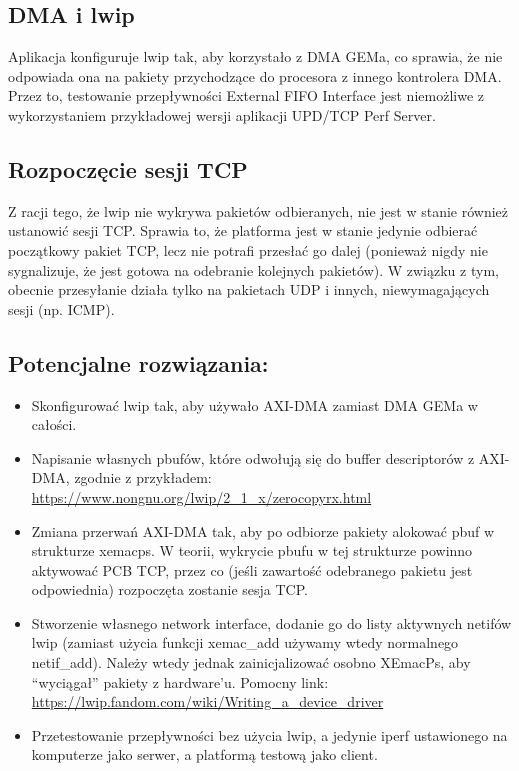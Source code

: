 \documentclass[11pt, letterpaper]{article}
\begin{document}
\subsection{DMA i lwip}
Aplikacja konfiguruje lwip tak, aby korzystało z DMA GEMa, co sprawia, że nie odpowiada ona na pakiety przychodzące do procesora z innego kontrolera DMA. Przez to, testowanie przepływności External FIFO Interface jest niemożliwe z wykorzystaniem przykładowej wersji aplikacji UPD/TCP Perf Server.
\subsection{Rozpoczęcie sesji TCP}
Z racji tego, że lwip nie wykrywa pakietów odbieranych, nie jest w stanie również ustanowić sesji TCP. Sprawia to, że platforma jest w stanie jedynie odbierać początkowy pakiet TCP, lecz nie potrafi przesłać go dalej (ponieważ nigdy nie sygnalizuje, że jest gotowa na odebranie kolejnych pakietów). W związku z tym, obecnie przesyłanie działa tylko na pakietach UDP i innych, niewymagających sesji (np. ICMP).
\subsection{Potencjalne rozwiązania:}
\begin{itemize}
    \item Skonfigurować lwip tak, aby używało AXI-DMA zamiast DMA GEMa w całości.
    \item Napisanie własnych pbufów, które odwołują się do buffer descriptorów z AXI-DMA, zgodnie z przykładem: 
        \\
        \url{https://www.nongnu.org/lwip/2\_1\_x/zerocopyrx.html}
    \item Zmiana przerwań AXI-DMA tak, aby po odbiorze pakiety alokować pbuf w strukturze xemacps. W teorii, wykrycie pbufu w tej strukturze powinno aktywować PCB TCP, przez co (jeśli zawartość odebranego pakietu jest odpowiednia) rozpoczęta zostanie sesja TCP.
    \item Stworzenie własnego network interface, dodanie go do listy aktywnych netifów lwip (zamiast użycia funkcji xemac\_add używamy wtedy normalnego netif\_add). Należy wtedy jednak zainicjalizować osobno XEmacPs, aby “wyciągał” pakiety z hardware’u. Pomocny link: 
        \\
        \url{https://lwip.fandom.com/wiki/Writing\_a\_device\_driver}
    \item Przetestowanie przepływności bez użycia lwip, a jedynie iperf ustawionego na komputerze jako serwer, a platformą testową jako client.
\end{itemize}
\end{document}
